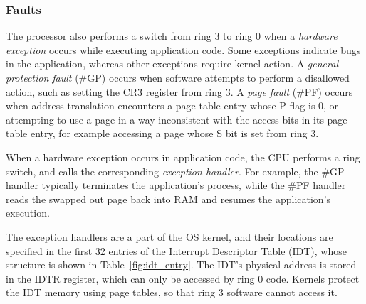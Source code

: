 \subsubsection{Faults}
\label{sec:faults}


The processor also performs a switch from ring 3 to ring 0 when a \textit{
hardware exception} occurs while executing application code. Some exceptions
indicate bugs in the application, whereas other exceptions require kernel
action. A \textit{general protection fault} (\#GP) occurs when software
attempts to perform a disallowed action, such as setting the CR3 register from
ring 3. A \textit{page fault} (\#PF) occurs when address translation encounters
a page table entry whose P flag is 0, or attempting to use a page in a way
inconsistent with the access bits in its page table entry, for example
accessing a page whose S bit is set from ring 3.


When a hardware exception occurs in application code, the CPU performs a ring
switch, and calls the corresponding \textit{exception handler}. For example,
the \#GP handler typically terminates the application's process, while the \#PF
handler reads the swapped out page back into RAM and resumes the application's
execution.

The exception handlers are a part of the OS kernel, and their locations are
specified in the first 32 entries of the Interrupt Descriptor Table (IDT),
whose structure is shown in Table~\ref{fig:idt_entry}. The IDT's physical
address is stored in the IDTR register, which can only be accessed by ring 0
code. Kernels protect the IDT memory using page tables, so that ring 3 software
cannot access it.

\begin{table}[hbt]
  \caption{
    The essential fields of an IDT entry in 64-bit mode. Each entry points to a
    hardware exception or interrupt handler.
  }
  \label{fig:idt_entry}
\end{table}

